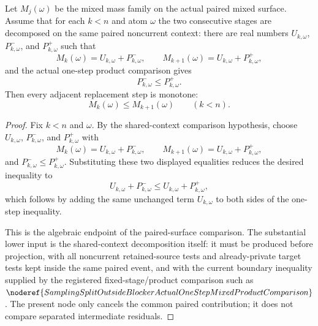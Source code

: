 \begin{helper}
Let \(M_j(\omega)\) be the mixed mass family on the actual paired mixed
surface.  Assume that for each \(k<n\) and atom \(\omega\) the two
consecutive stages are decomposed on the same paired noncurrent context:
there are real numbers \(U_{k,\omega}\), \(P^-_{k,\omega}\), and
\(P^+_{k,\omega}\) such that
\[
M_k(\omega)=U_{k,\omega}+P^-_{k,\omega},\qquad
M_{k+1}(\omega)=U_{k,\omega}+P^+_{k,\omega},
\]
and the actual one-step product comparison gives
\[
  P^-_{k,\omega}\le P^+_{k,\omega}.
\]
Then every adjacent replacement step is monotone:
\[
  M_k(\omega)\le M_{k+1}(\omega)\qquad(k<n).
\]
\end{helper}
\begin{proof}
Fix \(k<n\) and \(\omega\).  By the shared-context comparison hypothesis,
choose \(U_{k,\omega}\), \(P^-_{k,\omega}\), and \(P^+_{k,\omega}\) with
\[
M_k(\omega)=U_{k,\omega}+P^-_{k,\omega},\qquad
M_{k+1}(\omega)=U_{k,\omega}+P^+_{k,\omega},
\]
and \(P^-_{k,\omega}\le P^+_{k,\omega}\).  Substituting these two displayed
equalities reduces the desired inequality to
\[
  U_{k,\omega}+P^-_{k,\omega}
  \le U_{k,\omega}+P^+_{k,\omega},
\]
which follows by adding the same unchanged term \(U_{k,\omega}\) to both
sides of the one-step inequality.

This is the algebraic endpoint of the paired-surface comparison.  The
substantial lower input is the shared-context decomposition itself: it must
be produced before projection, with all noncurrent retained-source tests and
already-private target tests kept inside the same paired event, and with the
current boundary inequality supplied by the registered fixed-stage/product
comparison such as
\(\noderef{SamplingSplitOutsideBlockerActualOneStepMixedProductComparison}\).
The present node only cancels the common paired contribution; it does not
compare separated intermediate residuals.
\end{proof}

